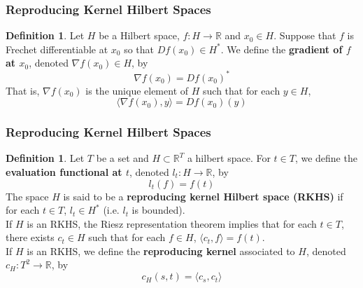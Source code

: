 \documentclass[notheorems]{beamer}
\theoremstyle{definition}
\newtheorem{defn}[definition]{Definition}
\newtheorem{fact}[definition]{Fact}
\newcommand{\R}{\mathbb{R}}
\renewcommand{\r}{\rangle}
\renewcommand{\l}{\langle}
\DeclareMathOperator*{\argmin}{arg\,min}
\begin{document}
\begin{frame}
\frametitle{Reproducing Kernel Hilbert Spaces}

\begin{defn}
Let $H$ be a Hilbert space, $f: H \rightarrow \R$ and $x_0 \in H$. Suppose that $f$ is Frechet differentiable at $x_0$ so that $Df(x_0) \in H^*$. We define the \textbf{gradient of $f$ at $x_0$}, denoted $\nabla f(x_0) \in H$, by $$\nabla f(x_0) = Df(x_0)^*$$ That is, $\nabla f(x_0)$ is the unique element of $H$ such that for each $y \in H$, $$\l \nabla f(x_0), y \r = Df(x_0)(y)$$
\end{defn}


%
%
\end{frame}



















\begin{frame}

\frametitle{Reproducing Kernel Hilbert Spaces}



\begin{defn}
Let $T$ be a set and $H \subset \R^T$ a hilbert space. For $t \in T$, we define the \textbf{evaluation functional at $t$}, denoted $l_t : H \rightarrow \R$, by $$l_t(f) = f(t)$$ 
\pause
The space $H$ is said to be a \textbf{reproducing kernel Hilbert space (RKHS)} if for each $t \in T$, $l_t \in H^*$ (i.e. $l_t$ is bounded). \\
\pause
If $H$ is an RKHS, the Riesz representation theorem implies that for each $t \in T$, there exists $c_t \in H$ such that for each $f \in H$, $\l c_t, f\r = f(t)$. \\
\pause
If $H$ is an RKHS, we define the \textbf{reproducing kernel} associated to $H$, denoted $c_H:T^2 \rightarrow \R$, by $$c_H(s,t) = \l c_s, c_t \r$$ 
\end{defn}
\end{frame}
\end{document}
